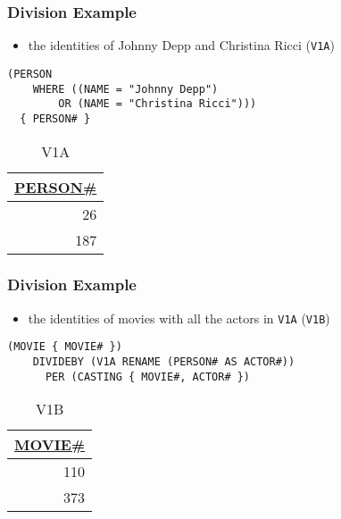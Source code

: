 \documentclass[dvipsnames]{beamer}
\theoremstyle{plain}
\begin{document}
\begin{frame}[fragile]
  \frametitle{Division Example}

  \begin{example}
    \begin{itemize}
      \item the identities of Johnny Depp and Christina Ricci (\texttt{V1A})
    \end{itemize}

    \begin{lstlisting}
(PERSON
    WHERE ((NAME = "Johnny Depp")
        OR (NAME = "Christina Ricci")))
  { PERSON# }
    \end{lstlisting}

    \pause
    \vspace{-10pt}
    \begin{tiny}
    \begin{table}
      \caption{V1A}
      \begin{tabular}{|r|}\hline
\underline{PERSON\#}\\[2pt]\hline\hline
                  26\\\hline
                 187\\\hline
      \end{tabular}
    \end{table}
    \end{tiny}
  \end{example}
\end{frame}

\begin{frame}[fragile]
  \frametitle{Division Example}

  \begin{example}
    \begin{itemize}
      \item the identities of movies with all the actors in \texttt{V1A}
        (\texttt{V1B})
    \end{itemize}

    \begin{lstlisting}
(MOVIE { MOVIE# })
    DIVIDEBY (V1A RENAME (PERSON# AS ACTOR#))
      PER (CASTING { MOVIE#, ACTOR# })
    \end{lstlisting}

    \pause
    \vspace{-10pt}
    \begin{tiny}
    \begin{table}
      \caption{V1B}
      \begin{tabular}{|r|}\hline
\underline{MOVIE\#}\\[2pt]\hline\hline
                110\\\hline
                373\\\hline
      \end{tabular}
    \end{table}
    \end{tiny}
  \end{example}
\end{frame}
\end{document}
